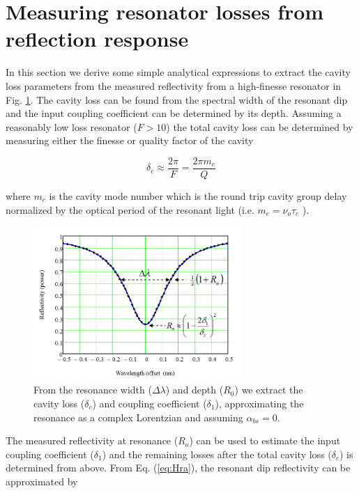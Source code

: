 \documentclass[10pt]{article}
\begin{document}
\section{Measuring resonator losses from reflection response}
In this section we derive some simple analytical expressions to extract the cavity loss parameters from the measured reflectivity from a high-finesse resonator in Fig. \ref{fig:dip}.
The cavity loss can be found from the spectral width of the resonant dip and the input coupling coefficient can be determined by its depth.
Assuming a reasonably low loss resonator ($F>10$) the total cavity loss can be determined by measuring either the finesse or quality factor of the cavity 


\begin{equation} 
\delta_c \approx \frac{2\pi}{F} = \frac{2 \pi m_c}{Q}
\end{equation}

\noindent  where $m_c$ is the cavity mode number which is the round trip cavity group delay normalized by the optical period of the resonant light (i.e.  $m_c = \nu_o \tau_c$ ).



\begin{figure}[htbp]
\centering\includegraphics[width=0.7\textwidth]{figures/dip}
\caption{From the resonance width ($ \Delta \lambda $) and depth ($ R_0 $) we extract the cavity loss ($ \delta_c $) and coupling coefficient ($ \delta_1 $), approximating the resonance as a complex Lorentzian and assuming $\alpha_{bs} = 0$.}
\label{fig:dip}
\end{figure}



The measured  reflectivity at resonance ($R_o$)   can be used to estimate the input coupling coefficient ($\delta_1$) and the remaining losses  after the total cavity loss ($\delta_c$) is determined from above.
From Eq. (\ref{eq:Hra}), the resonant dip reflectivity can be approximated by
\end{document}
